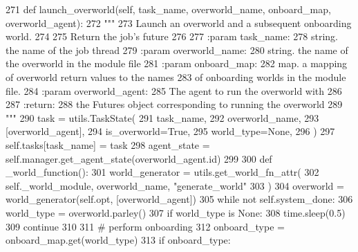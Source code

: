 \begin{DoxyCode}
271     \textcolor{keyword}{def }launch\_overworld(self, task\_name, overworld\_name, onboard\_map, overworld\_agent):
272         \textcolor{stringliteral}{"""}
273 \textcolor{stringliteral}{        Launch an overworld and a subsequent onboarding world.}
274 \textcolor{stringliteral}{}
275 \textcolor{stringliteral}{        Return the job's future}
276 \textcolor{stringliteral}{}
277 \textcolor{stringliteral}{        :param task\_name:}
278 \textcolor{stringliteral}{            string. the name of the job thread}
279 \textcolor{stringliteral}{        :param overworld\_name:}
280 \textcolor{stringliteral}{            string. the name of the overworld in the module file}
281 \textcolor{stringliteral}{        :param onboard\_map:}
282 \textcolor{stringliteral}{            map. a mapping of overworld return values to the names}
283 \textcolor{stringliteral}{            of onboarding worlds in the module file.}
284 \textcolor{stringliteral}{        :param overworld\_agent:}
285 \textcolor{stringliteral}{            The agent to run the overworld with}
286 \textcolor{stringliteral}{}
287 \textcolor{stringliteral}{        :return:}
288 \textcolor{stringliteral}{            the Futures object corresponding to running the overworld}
289 \textcolor{stringliteral}{        """}
290         task = utils.TaskState(
291             task\_name,
292             overworld\_name,
293             [overworld\_agent],
294             is\_overworld=\textcolor{keyword}{True},
295             world\_type=\textcolor{keywordtype}{None},
296         )
297         self.tasks[task\_name] = task
298         agent\_state = self.manager.get\_agent\_state(overworld\_agent.id)
299 
300         \textcolor{keyword}{def }\_world\_function():
301             world\_generator = utils.get\_world\_fn\_attr(
302                 self.\_world\_module, overworld\_name, \textcolor{stringliteral}{"generate\_world"}
303             )
304             overworld = world\_generator(self.opt, [overworld\_agent])
305             \textcolor{keywordflow}{while} \textcolor{keywordflow}{not} self.system\_done:
306                 world\_type = overworld.parley()
307                 \textcolor{keywordflow}{if} world\_type \textcolor{keywordflow}{is} \textcolor{keywordtype}{None}:
308                     time.sleep(0.5)
309                     \textcolor{keywordflow}{continue}
310 
311                 \textcolor{comment}{# perform onboarding}
312                 onboard\_type = onboard\_map.get(world\_type)
313                 \textcolor{keywordflow}{if} onboard\_type:

\end{DoxyCode}
